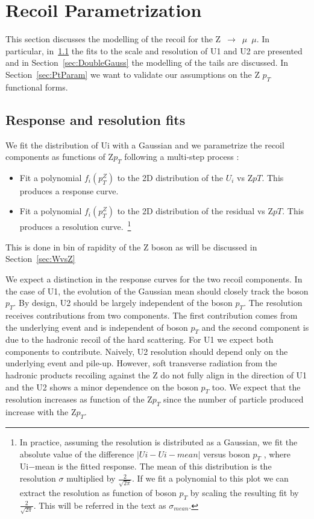 \documentclass[41pt,a4paper,oneside]{report}
\begin{document}


\newpage

\section{Recoil Parametrization}
{\color{magenta}{TWO ITEMS TO REVISE FUTHER:  1) U1scale Fit fixed at 0; 2)low pt description with refinedZpt;}}

\label{sec:ParamRecoil}
This section discusses the modelling of the recoil for the Z~$\rightarrow$~$\mu$~$\mu$. 
In particular, in~\ref{sec:Fits} the fits to the scale and resolution of U1 and U2 are presented and in Section~\ref{sec:DoubleGauss} the modelling of the tails are discussed.
In Section~\ref{sec:PtParam} we want to validate our assumptions on the Z $p_{T}$ functional forms.

\subsection{Response and resolution fits}
\label{sec:Fits}
We fit the distribution of Ui with a Gaussian and we parametrize the recoil components as functions of Z$p_{T}$ following a multi-step process :
\begin{itemize}
\item Fit a polynomial $f_{i}(p^{Z}_{T})$ to the 2D distribution of the $U_{i}$ vs Z$p{T}$. This produces a response curve.
\item Fit a polynomial $f_{i}(p^{Z}_{T})$ to the 2D distribution of the residual vs Z$p{T}$. This produces a resolution curve.~\footnote{
In practice, assuming the resolution is distributed as a Gaussian, we fit the absolute value of the difference $|Ui − Ui−mean|$ versus boson $p_{T}$ , 
where Ui−mean is the fitted response.
The mean of this distribution is the resolution $\sigma$ multiplied by $\frac{2}{\sqrt{2\pi}}$. If we fit a polynomial to this plot we can extract 
the resolution as function of boson $p_{T}$ by scaling the resulting fit by $\frac{2}{\sqrt{2\pi}}$. This will be referred in the text as $\sigma_{mean}$.
}
\end{itemize}
This is done in bin of rapidity of the Z boson as will be discussed in Section~\ref{sec:WvsZ}

We expect a distinction in the response curves for the two recoil components. In the case of U1, the evolution of
the Gaussian mean should closely track the boson $p_{T}$. By design, U2 should be largely independent of the boson $p_{T}$. 
The resolution receives contributions from two components. The first contribution comes from the underlying event
and is independent of boson $p_{T}$ and the second component is due to the hadronic recoil of the hard scattering. 
For U1 we expect both components to contribute. Naively, U2 resolution should depend only on the underlying event and pile-up. 
However, soft transverse radiation from the hadronic products recoiling against the Z do not fully align in the direction of U1 
and the U2 shows a minor dependence on the boson $p_{T}$ too.
We expect that the resolution increases as function of the Z$p_{T}$ since the number of particle produced increase with the Z$p_{T}$.
\end{document}

